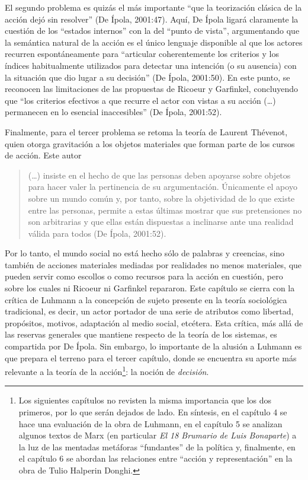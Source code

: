 El segundo problema es quizás el más importante \enquote{que la teorización clásica de la acción dejó sin resolver} (De Ípola, 2001:47). Aquí, De Ípola ligará claramente la cuestión de los \enquote{estados internos} con la del \enquote{punto de vista}, argumentando que la semántica natural de la acción es el único lenguaje disponible al que los actores recurren espontáneamente para \enquote{articular coherentemente los criterios y los índices habitualmente utilizados para detectar una intención (o su ausencia) con la situación que dio lugar a su decisión} (De Ípola, 2001:50). En este punto, se reconocen las limitaciones de las propuestas de Ricoeur y Garfinkel, concluyendo que \enquote{los criterios efectivos a que recurre el actor con vistas a su acción (\dots) permanecen en lo esencial inaccesibles} (De Ípola, 2001:52).

Finalmente, para el tercer problema se retoma la teoría de Laurent Thévenot, quien otorga gravitación a los objetos materiales que forman parte de los cursos de acción. Este autor

\begin{quote}
(\dots) insiste en el hecho de que las personas deben apoyarse sobre objetos para hacer valer la pertinencia de su argumentación. Únicamente el apoyo sobre un mundo común y, por tanto, sobre la objetividad de lo que existe entre las personas, permite a estas últimas mostrar que sus pretensiones no son arbitrarias y que ellas están dispuestas a inclinarse ante una realidad válida para todos (De Ípola, 2001:52).
\end{quote}

Por lo tanto, el mundo social no está hecho sólo de palabras y creencias, sino también de acciones materiales mediadas por realidades no menos materiales, que pueden servir como escollos o como recursos para la acción en cuestión, pero sobre los cuales ni Ricoeur ni Garfinkel repararon. Este capítulo se cierra con la crítica de Luhmann a la concepción de sujeto presente en la teoría sociológica tradicional, es decir, un actor portador de una serie de atributos como libertad, propósitos, motivos, adaptación al medio social, etcétera. Esta crítica, más allá de las reservas generales que mantiene respecto de la teoría de los sistemas, es compartida por De Ípola. Sin embargo, lo importante de la alusión a Luhmann es que prepara el terreno para el tercer capítulo, donde se encuentra su aporte más relevante a la teoría de la acción\footnote{Los siguientes capítulos no revisten la misma importancia que los dos primeros, por lo que serán dejados de lado. En síntesis, en el capítulo 4 se hace una evaluación de la obra de Luhmann, en el capítulo 5 se analizan algunos textos de Marx (en particular \emph{El 18 Brumario de Luis Bonaparte}) a la luz de las mentadas metáforas \enquote{fundantes} de la política y, finalmente, en el capítulo 6 se abordan las relaciones entre \enquote{acción y representación} en la obra de Tulio Halperin Donghi.}: la noción de \emph{decisión}.

